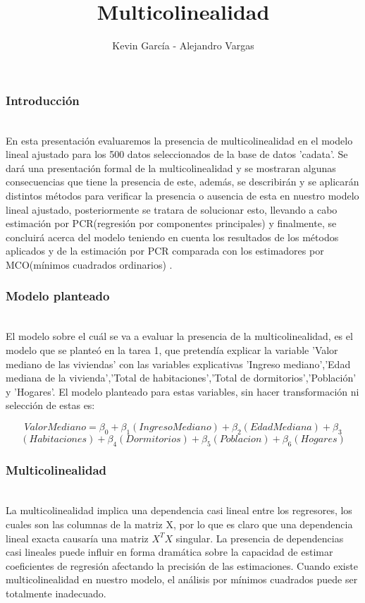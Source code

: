 \documentclass[12pt]{beamer}
\author{Kevin García - Alejandro Vargas}
\title{Multicolinealidad}
\begin{document}
\begin{frame}
\titlepage
\end{frame}

\begin{frame}
\frametitle{Introducción}
~\\ En esta presentación evaluaremos la presencia de multicolinealidad en el modelo lineal ajustado para los 500 datos seleccionados de la base de datos 'cadata'. Se dará una presentación formal de la multicolinealidad y se mostraran algunas consecuencias que tiene la presencia de este, además, se describirán y se aplicarán distintos métodos para verificar la presencia o ausencia de esta en nuestro modelo lineal ajustado, posteriormente se tratara de solucionar esto, llevando a cabo estimación por PCR(regresión por componentes principales) y finalmente, se concluirá acerca del modelo teniendo en cuenta los resultados de los métodos aplicados y de la estimación por PCR comparada con los estimadores por MCO(mínimos cuadrados ordinarios) .
\end{frame}

\begin{frame}
\frametitle{Modelo planteado}
~\\ El modelo sobre el cuál se va a evaluar la presencia de la multicolinealidad, es el modelo que se planteó en la tarea 1, que pretendía explicar la variable 'Valor mediano de las viviendas' con las variables explicativas 'Ingreso mediano','Edad mediana de la vivienda','Total de habitaciones','Total de dormitorios','Población' y 'Hogares'. El modelo planteado para estas variables, sin hacer transformación ni selección de estas es:

$$ValorMediano =\beta_{0}+\beta_{1}(IngresoMediano)+\beta_{2}(EdadMediana)+\beta_{3}$$
$$(Habitaciones)+\beta_{4}(Dormitorios)+\beta_{5}(Poblacion)+\beta_{6}(Hogares)$$ 
\end{frame}

\begin{frame}
\frametitle{Multicolinealidad}
~\\La multicolinealidad implica una dependencia casi lineal entre los regresores, los cuales son las columnas de la matriz X, por lo que es claro que una dependencia lineal exacta causaría una matriz $X^{T}X$ singular. La presencia de dependencias casi lineales puede influir en forma dramática sobre la capacidad de estimar coeficientes de regresión afectando la precisión de las estimaciones. Cuando existe multicolinealidad en nuestro modelo, el análisis por mínimos cuadrados puede ser totalmente inadecuado.
\end{frame}
\end{document}
